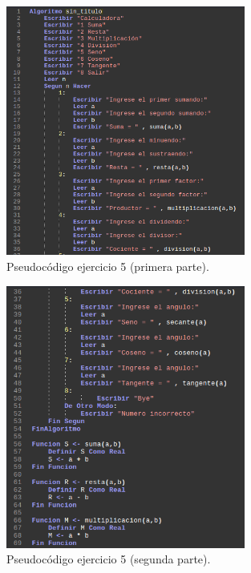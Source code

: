 \documentclass[11pt, a4paper]{report}
\begin{document}
\begin{figure}[!ht]
\begin{center}
  \includegraphics[width=0.7\textwidth]{ejercicio5.png}
  \caption{Pseudoc\'odigo ejercicio 5 (primera parte).}
\end{center}
\end{figure}

\begin{figure}[!ht]
\begin{center}
  \includegraphics[width=0.7\textwidth]{ejercicio51.png}
  \caption{Pseudoc\'odigo ejercicio 5 (segunda parte).}
\end{center}
\end{figure}
\end{document}
